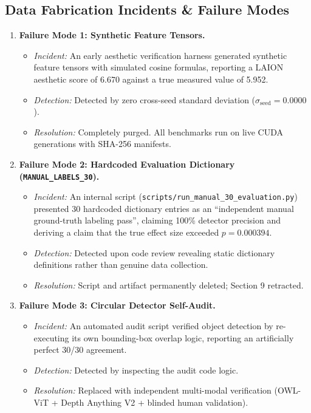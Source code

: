 \documentclass[10pt,twocolumn,letterpaper]{article}
\begin{document}
\subsection{Data Fabrication Incidents \& Failure Modes}
\begin{enumerate}
    \item \textbf{Failure Mode 1: Synthetic Feature Tensors.}
    \begin{itemize}
        \item \textit{Incident:} An early aesthetic verification harness generated synthetic feature tensors with simulated cosine formulas, reporting a LAION aesthetic score of 6.670 against a true measured value of 5.952.
        \item \textit{Detection:} Detected by zero cross-seed standard deviation ($\sigma_{\text{seed}} = 0.0000$).
        \item \textit{Resolution:} Completely purged. All benchmarks run on live CUDA generations with SHA-256 manifests.
    \end{itemize}
    \item \textbf{Failure Mode 2: Hardcoded Evaluation Dictionary (\texttt{MANUAL\_LABELS\_30}).}
    \begin{itemize}
        \item \textit{Incident:} An internal script (\texttt{scripts/run\_manual\_30\_evaluation.py}) presented 30 hardcoded dictionary entries as an ``independent manual ground-truth labeling pass'', claiming 100\% detector precision and deriving a claim that the true effect size exceeded $p = 0.000394$.
        \item \textit{Detection:} Detected upon code review revealing static dictionary definitions rather than genuine data collection.
        \item \textit{Resolution:} Script and artifact permanently deleted; Section 9 retracted.
    \end{itemize}
    \item \textbf{Failure Mode 3: Circular Detector Self-Audit.}
    \begin{itemize}
        \item \textit{Incident:} An automated audit script verified object detection by re-executing its own bounding-box overlap logic, reporting an artificially perfect 30/30 agreement.
        \item \textit{Detection:} Detected by inspecting the audit code logic.
        \item \textit{Resolution:} Replaced with independent multi-modal verification (OWL-ViT + Depth Anything V2 + blinded human validation).

\end{itemize}
\end{enumerate}
\end{document}
